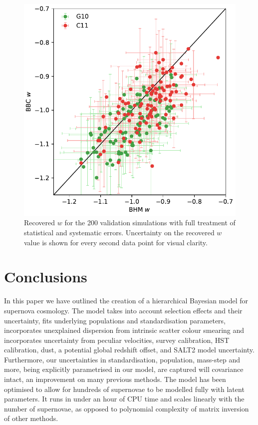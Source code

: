\documentclass[a4paper,fleqn,usenatbib]{mnras}
\begin{document}
\begin{figure}
	\begin{center}
		\includegraphics[width=\columnwidth]{bulk_comparison.pdf}
	\end{center}
	\caption{Recovered $w$ for the 200 validation simulations with full treatment of statistical and systematic errors. Uncertainty on the recovered $w$ value is shown for every second data point for visual clarity.}
	\label{fig:bulk_comparison}
\end{figure}












\section{Conclusions}
\label{sec:conclusion}

In this paper we have outlined the creation of a hierarchical Bayesian model for supernova cosmology. The model takes into account selection effects and their uncertainty, fits underlying populations and standardisation parameters, incorporates unexplained dispersion from intrinsic scatter colour smearing and incorporates uncertainty from peculiar velocities, survey calibration, HST calibration, dust, a potential global redshift offset, and SALT2 model uncertainty. Furthermore, our uncertainties in standardisation, population, mass-step and more, being explicitly parametrised in our model, are captured will covariance intact, an improvement on many previous methods. The model has been optimised to allow for hundreds of supernovae to be modelled fully with latent parameters. It runs in under an hour of CPU time and scales linearly with the number of supernovae, as opposed to polynomial complexity of matrix inversion of other methods.
\end{document}

